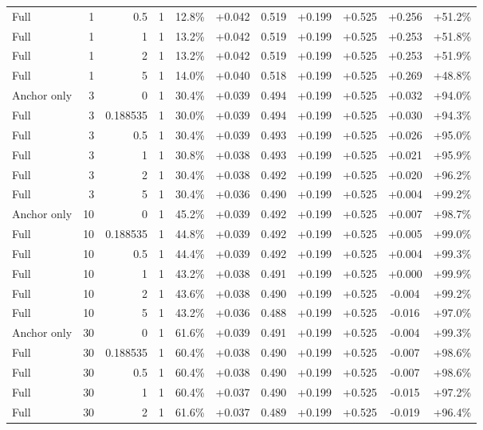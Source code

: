 \begin{table}[htbp]
\begin{tabular}{lrrrccccccc}
Full & 1 & 0.5 & 1 & 12.8\% & +0.042 & 0.519 & +0.199 & +0.525 & +0.256 & +51.2\% \\
Full & 1 & 1 & 1 & 13.2\% & +0.042 & 0.519 & +0.199 & +0.525 & +0.253 & +51.8\% \\
Full & 1 & 2 & 1 & 13.2\% & +0.042 & 0.519 & +0.199 & +0.525 & +0.253 & +51.9\% \\
Full & 1 & 5 & 1 & 14.0\% & +0.040 & 0.518 & +0.199 & +0.525 & +0.269 & +48.8\% \\
Anchor only & 3 & 0 & 1 & 30.4\% & +0.039 & 0.494 & +0.199 & +0.525 & +0.032 & +94.0\% \\
Full & 3 & 0.188535 & 1 & 30.0\% & +0.039 & 0.494 & +0.199 & +0.525 & +0.030 & +94.3\% \\
Full & 3 & 0.5 & 1 & 30.4\% & +0.039 & 0.493 & +0.199 & +0.525 & +0.026 & +95.0\% \\
Full & 3 & 1 & 1 & 30.8\% & +0.038 & 0.493 & +0.199 & +0.525 & +0.021 & +95.9\% \\
Full & 3 & 2 & 1 & 30.4\% & +0.038 & 0.492 & +0.199 & +0.525 & +0.020 & +96.2\% \\
Full & 3 & 5 & 1 & 30.4\% & +0.036 & 0.490 & +0.199 & +0.525 & +0.004 & +99.2\% \\
Anchor only & 10 & 0 & 1 & 45.2\% & +0.039 & 0.492 & +0.199 & +0.525 & +0.007 & +98.7\% \\
Full & 10 & 0.188535 & 1 & 44.8\% & +0.039 & 0.492 & +0.199 & +0.525 & +0.005 & +99.0\% \\
Full & 10 & 0.5 & 1 & 44.4\% & +0.039 & 0.492 & +0.199 & +0.525 & +0.004 & +99.3\% \\
Full & 10 & 1 & 1 & 43.2\% & +0.038 & 0.491 & +0.199 & +0.525 & +0.000 & +99.9\% \\
Full & 10 & 2 & 1 & 43.6\% & +0.038 & 0.490 & +0.199 & +0.525 & -0.004 & +99.2\% \\
Full & 10 & 5 & 1 & 43.2\% & +0.036 & 0.488 & +0.199 & +0.525 & -0.016 & +97.0\% \\
Anchor only & 30 & 0 & 1 & 61.6\% & +0.039 & 0.491 & +0.199 & +0.525 & -0.004 & +99.3\% \\
Full & 30 & 0.188535 & 1 & 60.4\% & +0.038 & 0.490 & +0.199 & +0.525 & -0.007 & +98.6\% \\
Full & 30 & 0.5 & 1 & 60.4\% & +0.038 & 0.490 & +0.199 & +0.525 & -0.007 & +98.6\% \\
Full & 30 & 1 & 1 & 60.4\% & +0.037 & 0.490 & +0.199 & +0.525 & -0.015 & +97.2\% \\
Full & 30 & 2 & 1 & 61.6\% & +0.037 & 0.489 & +0.199 & +0.525 & -0.019 & +96.4\% \\

\end{tabular}
\end{table}
